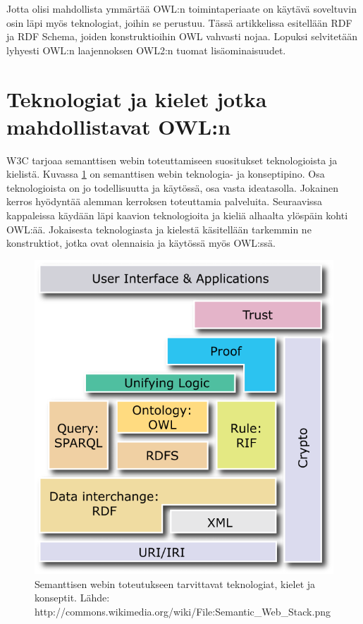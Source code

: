 \documentclass[finnish]{tktltiki2}
\theoremstyle{definition}
\theoremstyle{remark}
\begin{document}
Jotta olisi mahdollista ymmärtää OWL:n toimintaperiaate on käytävä soveltuvin osin läpi myös teknologiat, joihin
se perustuu. Tässä artikkelissa esitellään RDF ja RDF Schema, joiden konstruktioihin OWL vahvasti nojaa. 
Lopuksi selvitetään lyhyesti OWL:n laajennoksen OWL2:n tuomat lisäominaisuudet.  

\section{Teknologiat ja kielet jotka mahdollistavat OWL:n}
W3C tarjoaa semanttisen webin toteuttamiseen suositukset teknologioista ja
kielistä. Kuvassa \ref{stack} on semanttisen webin teknologia- ja konseptipino.
Osa teknologioista on jo todellisuutta ja
käytössä, osa vasta ideatasolla. Jokainen kerros hyödyntää alemman kerroksen toteuttamia
palveluita. Seuraavissa kappaleissa käydään läpi kaavion teknologioita ja kieliä
alhaalta ylöspäin kohti OWL:ää. Jokaisesta teknologiasta ja kielestä käsitellään tarkemmin
ne konstruktiot, jotka ovat olennaisia ja käytössä myös OWL:ssä.

\begin{figure}[h]
 \centering
 \includegraphics[scale=0.50]{stack.png}
 \caption{Semanttisen webin toteutukseen tarvittavat teknologiat, kielet ja konseptit. Lähde: http://commons.wikimedia.org/wiki/File:Semantic\_Web\_Stack.png }
 \label{stack}
\end{figure}
 
\end{document}
